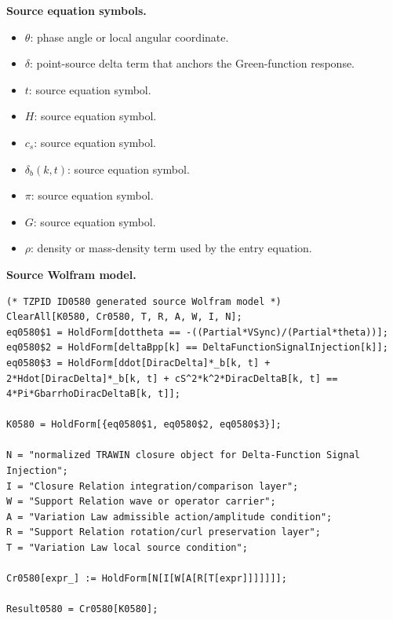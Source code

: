 \begin{minipage}[t]{0.49\linewidth}
\begingroup
\small
\raggedright
\textbf{Source equation symbols.}\par
\begin{itemize}[leftmargin=1.35em,itemsep=1pt,topsep=1pt,parsep=0pt]
    \item $\theta$: phase angle or local angular coordinate.
    \item $\delta$: point-source delta term that anchors the Green-function response.
    \item $t$: source equation symbol.
    \item $H$: source equation symbol.
    \item $c_s$: source equation symbol.
    \item $\delta_b(k,t)$: source equation symbol.
    \item $\pi$: source equation symbol.
    \item $G$: source equation symbol.
    \item $\rho$: density or mass-density term used by the entry equation.
\end{itemize}
\endgroup
\end{minipage}\hfill
\begin{minipage}[t]{0.47\linewidth}
\begingroup
\scriptsize
\raggedright
\textbf{Source Wolfram model.}\par
\begin{Verbatim}[fontsize=\tiny,breaklines=true,breakanywhere=true]
(* TZPID ID0580 generated source Wolfram model *)
ClearAll[K0580, Cr0580, T, R, A, W, I, N];
eq0580$1 = HoldForm[dottheta == -((Partial*VSync)/(Partial*theta))];
eq0580$2 = HoldForm[deltaBpp[k] == DeltaFunctionSignalInjection[k]];
eq0580$3 = HoldForm[ddot[DiracDelta]*_b[k, t] + 2*Hdot[DiracDelta]*_b[k, t] + cS^2*k^2*DiracDeltaB[k, t] == 4*Pi*GbarrhoDiracDeltaB[k, t]];

K0580 = HoldForm[{eq0580$1, eq0580$2, eq0580$3}];

N = "normalized TRAWIN closure object for Delta-Function Signal Injection";
I = "Closure Relation integration/comparison layer";
W = "Support Relation wave or operator carrier";
A = "Variation Law admissible action/amplitude condition";
R = "Support Relation rotation/curl preservation layer";
T = "Variation Law local source condition";

Cr0580[expr_] := HoldForm[N[I[W[A[R[T[expr]]]]]]];

Result0580 = Cr0580[K0580];
\end{Verbatim}
\endgroup
\end{minipage}

